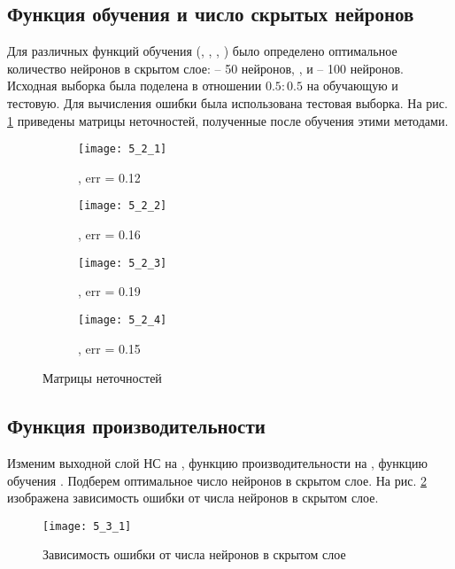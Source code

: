 \subsection{Функция обучения и число скрытых нейронов}

Для различных функций обучения (, , , ) было определено оптимальное количество нейронов в скрытом слое:  -- 50 нейронов, ,  и  -- 100 нейронов. Исходная выборка была поделена в отношении $0.5 : 0.5$ на обучающую и тестовую. Для вычисления ошибки была использована тестовая выборка. На рис. \ref{fig:5_2_1} приведены матрицы неточностей, полученные после обучения этими методами.

\begin{figure}[H]
\begin{center}
	\begin{subfigure}[b]{0.49\textwidth}
		\texttt{[image: 5\_2\_1]}
		\caption{, err = 0.12}
	\end{subfigure}
	\begin{subfigure}[b]{0.49\textwidth}
		\texttt{[image: 5\_2\_2]}
		\caption{, err = 0.16}
	\end{subfigure}
	\begin{subfigure}[b]{0.49\textwidth}
		\texttt{[image: 5\_2\_3]}
		\caption{, err = 0.19}
	\end{subfigure}
	\begin{subfigure}[b]{0.49\textwidth}
		\texttt{[image: 5\_2\_4]}
		\caption{, err = 0.15}
	\end{subfigure}
	\caption{Матрицы неточностей}
	\label{fig:5_2_1}
\end{center}
\end{figure}

\subsection{Функция производительности}

Изменим выходной слой НС на , функцию производительности на , функцию обучения . Подберем оптимальное число нейронов в скрытом слое. На рис. \ref{fig:5_3_1} изображена зависимость ошибки от числа нейронов в скрытом слое.
\begin{figure}[H]
\begin{center}
	\texttt{[image: 5\_3\_1]}
	\caption{Зависимость ошибки от числа нейронов в скрытом слое}
	\label{fig:5_3_1}
\end{center}
\end{figure}


